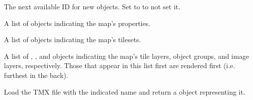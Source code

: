 \documentclass[letterpaper,10pt,english]{sphinxmanual}
\begin{document}
\begin{fulllineitems}
\begin{fulllineitems}
\label{index:tmx.TileMap.nextobjectid}
The next available ID for new objects.  Set to  to
not set it.

\end{fulllineitems}


\begin{fulllineitems}
\label{index:tmx.TileMap.properties}
A list of {\hyperref[index:tmx.Property]{\emph{}}} objects indicating the map's
properties.

\end{fulllineitems}


\begin{fulllineitems}
\label{index:tmx.TileMap.tilesets}
A list of {\hyperref[index:tmx.Tileset]{\emph{}}} objects indicating the map's tilesets.

\end{fulllineitems}


\begin{fulllineitems}
\label{index:tmx.TileMap.layers}
A list of {\hyperref[index:tmx.Layer]{\emph{}}}, {\hyperref[index:tmx.ObjectGroup]{\emph{}}}, and
{\hyperref[index:tmx.ImageLayer]{\emph{}}} objects indicating the map's tile layers,
object groups, and image layers, respectively.  Those that appear
in this list first are rendered first (i.e. furthest in the
back).

\end{fulllineitems}


\end{fulllineitems}


\begin{fulllineitems}
\label{index:tmx.TileMap.load}
Load the TMX file with the indicated name and return a
{\hyperref[index:tmx.TileMap]{\emph{}}} object representing it.

\end{fulllineitems}
\end{document}
